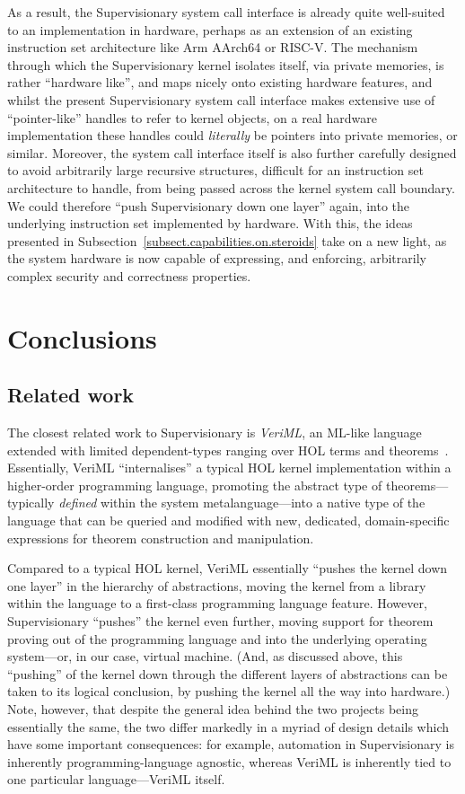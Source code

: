 \documentclass[a4paper, UKenglish, cleveref, autoref, thm-restate, colorlinks]{lipics-v2021}
\begin{document}
As a result, the Supervisionary system call interface is already quite well-suited to an implementation in hardware, perhaps as an extension of an existing instruction set architecture like Arm AArch64 or RISC-V.
The mechanism through which the Supervisionary kernel isolates itself, via private memories, is rather ``hardware like'', and maps nicely onto existing hardware features, and whilst the present Supervisionary system call interface makes extensive use of ``pointer-like'' handles to refer to kernel objects, on a real hardware implementation these handles could \emph{literally} be pointers into private memories, or similar.
Moreover, the system call interface itself is also further carefully designed to avoid arbitrarily large recursive structures, difficult for an instruction set architecture to handle, from being passed across the kernel system call boundary.
We could therefore ``push Supervisionary down one layer'' again, into the underlying instruction set implemented by hardware.
With this, the ideas presented in Subsection~\ref{subsect.capabilities.on.steroids} take on a new light, as the system hardware is now capable of expressing, and enforcing, arbitrarily complex security and correctness properties.

\section{Conclusions}
\label{sect.conclusions}

\subsection{Related work}

The closest related work to Supervisionary is \emph{VeriML}, an ML-like language extended with limited dependent-types ranging over HOL terms and theorems~\cite{DBLP:conf/icfp/StampoulisS10}.
Essentially, VeriML ``internalises'' a typical HOL kernel implementation within a higher-order programming language, promoting the abstract type of theorems---typically \emph{defined} within the system metalanguage---into a native type of the language that can be queried and modified with new, dedicated, domain-specific expressions for theorem construction and manipulation.

Compared to a typical HOL kernel, VeriML essentially ``pushes the kernel down one layer'' in the hierarchy of abstractions, moving the kernel from a library within the language to a first-class programming language feature.
However, Supervisionary ``pushes'' the kernel even further, moving support for theorem proving out of the programming language and into the underlying operating system---or, in our case, virtual machine.
(And, as discussed above, this ``pushing'' of the kernel down through the different layers of abstractions can be taken to its logical conclusion, by pushing the kernel all the way into hardware.)
Note, however, that despite the general idea behind the two projects being essentially the same, the two differ markedly in a myriad of design details which have some important consequences: for example, automation in Supervisionary is inherently programming-language agnostic, whereas VeriML is inherently tied to one particular language---VeriML itself.
\end{document}
